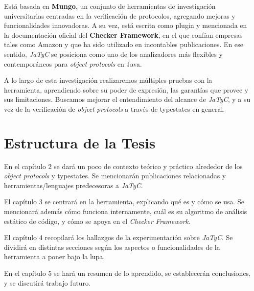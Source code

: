 Está basada en \textbf{Mungo}\cite{mungo:website}, un conjunto de herramientas de investigación universitarias centradas en la verificación de protocolos, agregando mejoras y funcionalidades innovadoras\cite{jatyc:mungo-comparison}. A su vez, está escrita como plugin y mencionada en la documentación oficial del \textbf{Checker Framework}\cite{checker-framework}, en el que confían empresas tales como Amazon\cite{aws:crypto-policy-compliance-checker}\cite{aws:kms-compliance-checker} y que ha sido utilizado en incontables publicaciones. En ese sentido, \textit{JaTyC} se posiciona como uno de los analizadores más flexibles y contemporáneos para \textit{object protocols} en Java.

A lo largo de esta investigación realizaremos múltiples pruebas con la herramienta, aprendiendo sobre su poder de expresión, las garantías que provee y sus limitaciones. Buscamos mejorar el entendimiento del alcance de \textit{JaTyC}, y a su vez de la verificación de \textit{object protocols} a través de typestates en general.

\section{Estructura de la Tesis}

En el capítulo 2 se dará un poco de contexto teórico y práctico alrededor de los \textit{object protocols} y typestates. Se mencionarán publicaciones relacionadas y herramientas/lenguajes predecesoras a \textit{JaTyC}.

El capítulo 3 se centrará en la herramienta, explicando qué es y cómo se usa. Se mencionará además cómo funciona internamente, cuál es su algoritmo de análisis estático de código, y cómo se apoya en el \textit{Checker Framework}.

El capítulo 4 recopilará los hallazgos de la experimentación sobre \textit{JaTyC}. Se dividirá en distintas secciones según los aspectos o funcionalidades de la herramienta a poner bajo la lupa.

En el capítulo 5 se hará un resumen de lo aprendido, se establecerán conclusiones, y se discutirá trabajo futuro. 